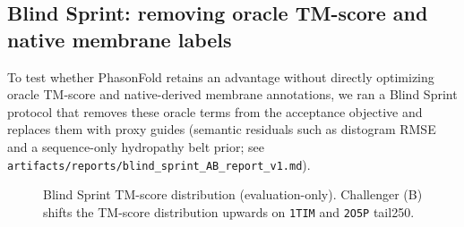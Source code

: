 \subsection{Blind Sprint: removing oracle TM-score and native membrane labels}

To test whether PhasonFold retains an advantage without directly optimizing oracle TM-score and native-derived membrane annotations, we ran a Blind Sprint protocol that removes these oracle terms from the acceptance objective and replaces them with proxy guides (semantic residuals such as distogram RMSE and a sequence-only hydropathy belt prior; see \texttt{artifacts/reports/blind\_sprint\_AB\_report\_v1.md}).

\begin{table}[t]
  \centering
  \caption{Blind Sprint A/B summary (evaluation TM-score reported; not used for acceptance).}
  \label{tab:4}
\end{table}

\begin{figure}[t]
  \centering
  \caption{Blind Sprint TM-score distribution (evaluation-only). Challenger (B) shifts the TM-score distribution upwards on \texttt{1TIM} and \texttt{2O5P} tail250.}
  \label{fig:13}
\end{figure}
